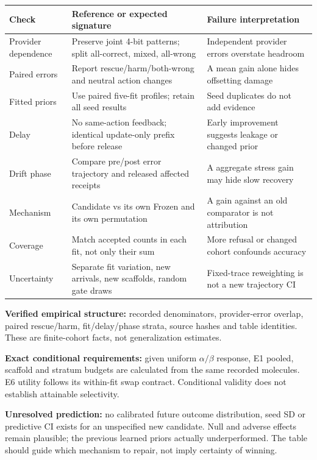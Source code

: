 \documentclass[10pt,letterpaper]{article}
\newcommand{\sect}[1]{\vspace{5pt}{\large\bfseries #1}\par\vspace{2pt}}
\newenvironment{clean}{\begin{center}\fontsize{9.5}{11.5}\selectfont\setlength{\tabcolsep}{6pt}\renewcommand{\arraystretch}{1.06}}{\end{center}}
\begin{document}
\begin{clean}\begin{tabular}{@{}p{.20\linewidth}p{.39\linewidth}p{.32\linewidth}@{}}
\toprule
Check & Reference or expected signature & Failure interpretation \\
\midrule
Provider dependence & Preserve joint 4-bit patterns; split all-correct, mixed, all-wrong & Independent provider errors overstate headroom \\
Paired errors & Report rescue/harm/both-wrong and neutral action changes & A mean gain alone hides offsetting damage \\
Fitted priors & Use paired five-fit profiles; retain all seed results & Seed duplicates do not add evidence \\
Delay & No same-action feedback; identical update-only prefix before release & Early improvement suggests leakage or changed prior \\
Drift phase & Compare pre/post error trajectory and released affected receipts & A aggregate stress gain may hide slow recovery \\
Mechanism & Candidate vs its own Frozen and its own permutation & A gain against an old comparator is not attribution \\
Coverage & Match accepted counts in each fit, not only their sum & More refusal or changed cohort confounds accuracy \\
Uncertainty & Separate fit variation, new arrivals, new scaffolds, random gate draws & Fixed-trace reweighting is not a new trajectory CI \\
\bottomrule
\end{tabular}\end{clean}
\sect{What has high-confidence support, and what still needs evidence}
\textbf{Verified empirical structure:} recorded denominators, provider-error overlap, paired rescue/harm,
fit/delay/phase strata, source hashes and table identities. These are finite-cohort facts, not generalization estimates.

\textbf{Exact conditional requirements:} given uniform $\alpha/\beta$ response, E1 pooled,
scaffold and stratum budgets are calculated from the same recorded molecules. E6 utility follows its
within-fit swap contract. Conditional validity does not establish attainable selectivity.

\textbf{Unresolved prediction:} no calibrated future outcome distribution, seed SD or predictive CI exists
for an unspecified new candidate. Null and adverse effects remain plausible; the previous learned
priors actually underperformed. The table should guide which mechanism to repair, not imply certainty of winning.
\end{document}
